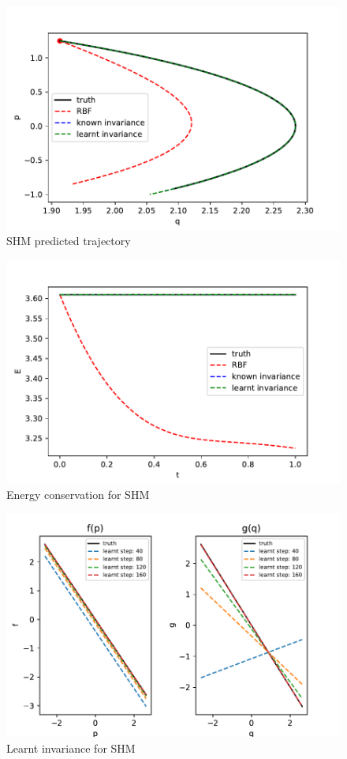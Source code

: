\documentclass{statsmsc}
\begin{document}
\begin{figure}[H]
        \centering
        \includegraphics[width=0.8\linewidth]{../codes/figures/shm_predicted.pdf}
        \caption{SHM predicted trajectory}
        \label{fig:shm_prediction}
\end{figure}

\begin{figure}[H] 
  \includegraphics[width=0.8\linewidth]{../codes/figures/shm_energy.pdf}
  \centering
  \caption{Energy conservation for SHM}
  \label{fig:shm_energy}
\end{figure}

\begin{figure}[H] 
  \includegraphics[width=0.8\linewidth]{../codes/figures/shm_learnt_over_time.pdf}
  \centering
  \caption{Learnt invariance for SHM}
  \label{fig:shm_learnt}
\end{figure}
\end{document}
